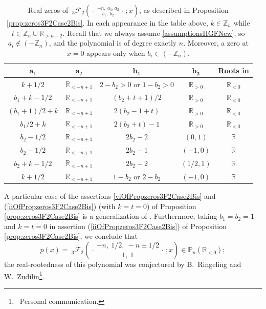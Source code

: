 \documentclass[reqno,11pt]{amsart}
\theoremstyle{remark}
\renewcommand{\P}{\mathbb{P}}
\newcommand{\R}{\mathbb{R}}
\newcommand{\Z}{\mathbb{Z}}
\newcommand{\rr}{\mathbb{R}}
\newcommand*\pFq[5]{%
 {\ }_{#1}{\mathcal F}_{#2}{\left(\genfrac..{0pt}{}{#3}{#4};#5\right)}%
}
\begin{document}
\begin{table}[hb]
    \centering
    \begin{tabular}{|c|c|c|c|c|}
    \hline $\mathbf{a}_1$ &  $\mathbf{a}_2$ & $\mathbf{b_1}$&$\mathbf{b_2}$ & \textbf{Roots in}  \\
\hline $k+1/2$  & $\mathbb{R}_{< -n+1}$ & $2-b_2>0$ or $1-b_2>0$ & $\mathbb{R}_{>0}$ 
& $\mathbb{R}_{< 0}$  \\
\hline $b_1+k-1/2$ & $\mathbb{R}_{< -n+1}$ & $(b_2+t+1)/2$ & $\mathbb{R}_{>0}$ 
& $\mathbb{R}_{< 0}$  \\
\hline $(b_1+1)/2+k$  & $\mathbb{R}_{< -n+1}$ & $ 2(b_2-1+t)$ & $\mathbb{R}_{>0}$ 
& $\mathbb{R}_{< 0}$  \\
\hline $b_1 /2+k$  & $\mathbb{R}_{< -n+1}$ & $ 2(b_2+t)-1$ & $\mathbb{R}_{>0}$ 
& $\mathbb{R}_{< 0}$  \\
\hline $b_2 -1/2$ & $\mathbb{R}_{< -n+1}$ & $2b_2-2$  & $(0,1 )$ 
& $\mathbb{R} $  \\
\hline $b_2 -1/2$ & $\mathbb{R}_{< -n+1}$ & $2b_2-1$  & $(-1, 0 )$ 
& $\mathbb{R} $  \\
\hline $b_2+k-1/2$ & $\mathbb{R}_{< -n+1}$ & $2b_2-2$  & $(1/2,1)$ 
& $\mathbb{R} $  \\
\hline $k+1/2$ & $\mathbb{R}_{< -n+1}$ & $1-b_2$ or $2-b_2$   & $ (-1,0)  $ 
& $\mathbb{R} $  \\
\hline
\end{tabular}
\vspace{2mm}
\caption{Real zeros of $\pFq{3}{2}{-n,\  a_1, a_2}{ b_1,\ b_2}{x}$, as described in Proposition \ref{prop:zeros3F2Case2Bis}. In each appearance in the table above, $k\in \mathbb Z_n $ while $t\in \mathbb Z_n \cup  \rr_{>n-2}$. Recall that we always assume \eqref{assumptionsHGFNew}, so $  a_i \notin (-\Z_n)$, and the polynomial is of degree exactly $n$. Moreover, a zero at $x=0$ appears only when $b_i \in (-\Z_n)$.
  }
    \label{tab:3F2case2}
\end{table}

A particular case of the assertions \eqref{viOfPropzeros3F2Case2Bis} and (\ref{iiOfPropzeros3F2Case2Bis}) (with $k=t=0$) of Proposition \ref{prop:zeros3F2Case2Bis} is a generalization of \cite[Theorem 8]{MR2324318}. Furthermore, taking   $b_1=b_2=1$ and $k=t=0$ in assertion  (\ref{iiOfPropzeros3F2Case2Bis})  of Proposition \ref{prop:zeros3F2Case2Bis}, we conclude that 
$$
p(x)=\pFq{3}{2}{-n,\ 1/2, \ -n\pm 1/2 }{1,\ 1}{x} \in \P_n(\R_{<0});
$$
the real-rootedness of this polynomial was conjectured by B.~Ringeling and W.~Zudilin\footnote{\, Personal communication.}.
\end{document}
